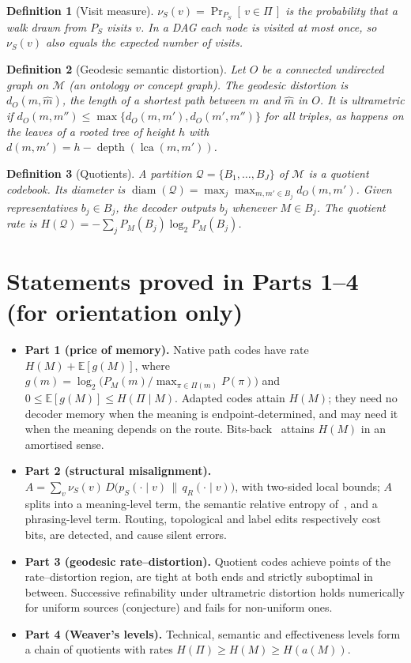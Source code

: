 \documentclass[11pt]{article}
\newtheorem{definition}{Definition}
\theoremstyle{remark}
\newcommand{\M}{\mathcal{M}}
\newcommand{\Pset}{\Pi}
\newcommand{\E}{\mathbb{E}}
\newcommand{\D}{D}
\begin{document}
\begin{definition}[Visit measure]\label{def:visits}
$\nu_S(v)=\Pr_{P_S}[\,v\in\Pi\,]$ is the probability that a walk drawn from $P_S$ visits $v$. In a DAG each node is visited at most once, so $\nu_S(v)$ also equals the expected number of visits.
\end{definition}

\begin{definition}[Geodesic semantic distortion]\label{def:dist}
Let $O$ be a connected undirected graph on $\M$ (an ontology or concept graph). The \emph{geodesic distortion} is $d_O(m,\hat m)$, the length of a shortest path between $m$ and $\hat m$ in $O$. It is \emph{ultrametric} if $d_O(m,m'')\le\max\{d_O(m,m'),d_O(m',m'')\}$ for all triples, as happens on the leaves of a rooted tree of height $h$ with $d(m,m')=h-\operatorname{depth}(\operatorname{lca}(m,m'))$.
\end{definition}

\begin{definition}[Quotients]\label{def:quotient}
A partition $\mathcal{Q}=\{B_1,\dots,B_J\}$ of $\M$ is a \emph{quotient codebook}. Its diameter is $\operatorname{diam}(\mathcal{Q})=\max_j\max_{m,m'\in B_j}d_O(m,m')$. Given representatives $b_j\in B_j$, the decoder outputs $b_j$ whenever $M\in B_j$. The quotient rate is $H(\mathcal{Q})=-\sum_j P_M(B_j)\log_2P_M(B_j)$.
\end{definition}

\section{Statements proved in Parts 1--4 (for orientation only)}

\begin{itemize}
\item \textbf{Part 1 (price of memory).} Native path codes have rate $H(M)+\E[g(M)]$, where $g(m)=\log_2\bigl(P_M(m)/\max_{\pi\in\Pset(m)}P(\pi)\bigr)$ and $0\le\E[g(M)]\le H(\Pset\mid M)$. Adapted codes attain $H(M)$; they need no decoder memory when the meaning is endpoint-determined, and may need it when the meaning depends on the route. Bits-back~\cite{frey1997} attains $H(M)$ in an amortised sense.
\item \textbf{Part 2 (structural misalignment).} $A=\sum_v\nu_S(v)\,\D\bigl(p_S(\cdot\mid v)\,\|\,q_R(\cdot\mid v)\bigr)$, with two-sided local bounds; $A$ splits into a meaning-level term, the semantic relative entropy of~\cite[Def.~4.1]{niu2025}, and a phrasing-level term. Routing, topological and label edits respectively cost bits, are detected, and cause silent errors.
\item \textbf{Part 3 (geodesic rate--distortion).} Quotient codes achieve points of the rate--distortion region, are tight at both ends and strictly suboptimal in between. Successive refinability under ultrametric distortion holds numerically for uniform sources (conjecture) and fails for non-uniform ones.
\item \textbf{Part 4 (Weaver's levels).} Technical, semantic and effectiveness levels form a chain of quotients with rates $H(\Pi)\ge H(M)\ge H(a(M))$.
\end{itemize}
\end{document}
